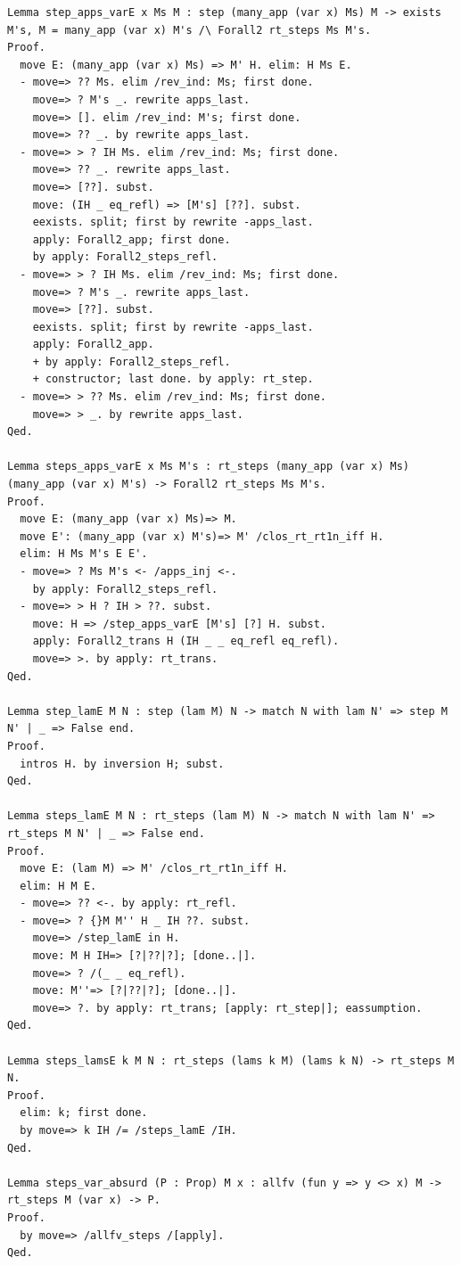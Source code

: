 \begin{lstlisting}
Lemma step_apps_varE x Ms M : step (many_app (var x) Ms) M -> exists M's, M = many_app (var x) M's /\ Forall2 rt_steps Ms M's.
Proof.
  move E: (many_app (var x) Ms) => M' H. elim: H Ms E.
  - move=> ?? Ms. elim /rev_ind: Ms; first done.
    move=> ? M's _. rewrite apps_last.
    move=> []. elim /rev_ind: M's; first done.
    move=> ?? _. by rewrite apps_last.
  - move=> > ? IH Ms. elim /rev_ind: Ms; first done.
    move=> ?? _. rewrite apps_last.
    move=> [??]. subst.
    move: (IH _ eq_refl) => [M's] [??]. subst.
    eexists. split; first by rewrite -apps_last.
    apply: Forall2_app; first done.
    by apply: Forall2_steps_refl.
  - move=> > ? IH Ms. elim /rev_ind: Ms; first done.
    move=> ? M's _. rewrite apps_last.
    move=> [??]. subst.
    eexists. split; first by rewrite -apps_last.
    apply: Forall2_app.
    + by apply: Forall2_steps_refl.
    + constructor; last done. by apply: rt_step.
  - move=> > ?? Ms. elim /rev_ind: Ms; first done.
    move=> > _. by rewrite apps_last.
Qed.

Lemma steps_apps_varE x Ms M's : rt_steps (many_app (var x) Ms) (many_app (var x) M's) -> Forall2 rt_steps Ms M's.
Proof.
  move E: (many_app (var x) Ms)=> M.
  move E': (many_app (var x) M's)=> M' /clos_rt_rt1n_iff H.
  elim: H Ms M's E E'.
  - move=> ? Ms M's <- /apps_inj <-.
    by apply: Forall2_steps_refl.
  - move=> > H ? IH > ??. subst.
    move: H => /step_apps_varE [M's] [?] H. subst.
    apply: Forall2_trans H (IH _ _ eq_refl eq_refl).
    move=> >. by apply: rt_trans.
Qed.

Lemma step_lamE M N : step (lam M) N -> match N with lam N' => step M N' | _ => False end.
Proof.
  intros H. by inversion H; subst.
Qed.

Lemma steps_lamE M N : rt_steps (lam M) N -> match N with lam N' => rt_steps M N' | _ => False end.
Proof.
  move E: (lam M) => M' /clos_rt_rt1n_iff H.
  elim: H M E.
  - move=> ?? <-. by apply: rt_refl.
  - move=> ? {}M M'' H _ IH ??. subst.
    move=> /step_lamE in H.
    move: M H IH=> [?|??|?]; [done..|].
    move=> ? /(_ _ eq_refl).
    move: M''=> [?|??|?]; [done..|].
    move=> ?. by apply: rt_trans; [apply: rt_step|]; eassumption.
Qed.

Lemma steps_lamsE k M N : rt_steps (lams k M) (lams k N) -> rt_steps M N.
Proof.
  elim: k; first done.
  by move=> k IH /= /steps_lamE /IH.
Qed.

Lemma steps_var_absurd (P : Prop) M x : allfv (fun y => y <> x) M -> rt_steps M (var x) -> P.
Proof.
  by move=> /allfv_steps /[apply].
Qed.


\end{lstlisting}
